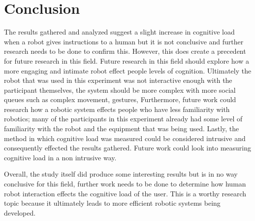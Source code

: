 \documentclass[conference]{IEEEtran}
\begin{document}
\section{Conclusion}
The results gathered and analyzed suggest a slight increase in cognitive load when a robot gives instructions to a human but it is not conclusive and further research needs to be done to confirm this. However, this does create a precedent for future research in this field.\newline
Future research in this field should explore how a more engaging and intimate robot effect people levels of cognition. Ultimately the robot that was used in this experiment was not interactive enough with the participant themselves, the system should be more complex with more social queues such as complex movement, gestures, Furthermore, future work could research how a robotic system effects people who have less familiarity with robotics; many of the participants in this experiment already had some level of familiarity with the robot and the equipment that was being used. Lastly, the method in which cognitive load was measured could be considered intrusive and consequently effected the results gathered. Future work could look into measuring cognitive load in a non intrusive way. \newline

Overall, the study itself did produce some interesting results but is in no way conclusive for this field, further work needs to be done to determine how human robot interaction effects the cognitive load of the user. This is a worthy research topic because it ultimately leads to more efficient robotic systems being developed.

\end{document}
